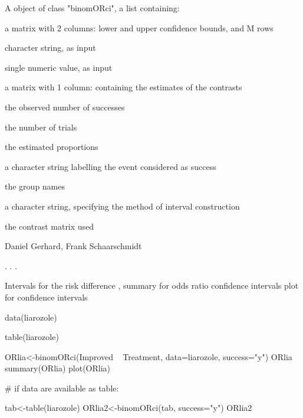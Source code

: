 \begin{Value}
A object of class "binomORci", a list containing:
\begin{ldescription}
\item[\code{conf.int}] a matrix with 2 columns: lower and upper confidence bounds, and M rows
\item[\code{alternative }] character string, as input
\item[\code{conf.level}] single numeric value, as input
\item[\code{estimate}] a matrix with 1 column: containing the estimates of the contrasts
\item[\code{x}] the observed number of successes
\item[\code{n}] the number of trials
\item[\code{p}] the estimated proportions
\item[\code{success}] a character string labelling the event considered as success
\item[\code{names}] the group names
\item[\code{method}] a character string, specifying the method of interval construction
\item[\code{cmat}] the contrast matrix used
\end{ldescription}
\end{Value}
\begin{Note}\relax
\end{Note}
\begin{Author}\relax
Daniel Gerhard, Frank Schaarschmidt
\end{Author}
\begin{References}\relax
. . .
\end{References}
\begin{SeeAlso}\relax
Intervals for the risk difference ,
summary for odds ratio confidence intervals 
plot for confidence intervals 
\end{SeeAlso}
\begin{Examples}
\begin{ExampleCode}
data(liarozole)

table(liarozole)

ORlia<-binomORci(Improved ~ Treatment, data=liarozole, success="y")
ORlia
summary(ORlia)
plot(ORlia)

# if data are available as table:

tab<-table(liarozole)
ORlia2<-binomORci(tab, success="y")
ORlia2


\end{ExampleCode}
\end{Examples}

